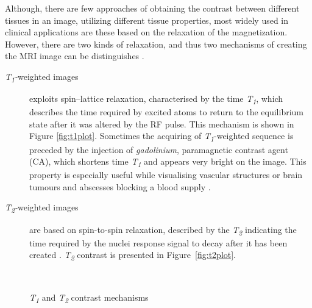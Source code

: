 Although, there are few approaches of obtaining the contrast between different tissues in an image, utilizing different tissue properties, most widely used in clinical applications are these based on the relaxation of the magnetization. However, there are two kinds of relaxation, and thus two mechanisms of creating the MRI image can be distinguishes \cite{biomedical_hanbook_imaging}.
\begin{description}
		\item [\textit{T\textsubscript{1}-}weighted images] exploits spin–lattice relaxation, characterised by the time \textit{T\textsubscript{1}}, which describes the time required by excited atoms to return to the equilibrium state after it was altered by the RF pulse. This mechanism is shown in Figure \ref{fig:t1plot}. Sometimes the acquiring of \textit{T\textsubscript{1}}-weighted sequence is preceded by the injection of \textit{gadolinium}, paramagnetic contrast agent (CA), which  shortens time \textit{T\textsubscript{1}} and appears very bright on the image. This property is especially useful while visualising vascular structures or brain tumours and abscesses blocking a blood supply \cite{biomedical_hanbook_imaging, grover2015magnetic}.   
		
		\item [\textit{T\textsubscript{2}-}weighted images] are based on spin-to-spin relaxation, described by the \textit{T\textsubscript{2}} indicating the time required by the nuclei response signal to decay after it has been created \cite{biomedical_hanbook_imaging, grover2015magnetic}. \textit{T\textsubscript{2}} contrast is presented in Figure~\ref{fig:t2plot}. 
\end{description}
\begin{figure}[H]
\captionsetup[subfloat]{captionskip=0.5cm}
	\centering
	\hspace{1.5cm}
	\\	
\vspace{0.5cm}
\caption[\textit{T\textsubscript{1}} and \textit{T\textsubscript{2}} contrast mechanisms]{\textit{T\textsubscript{1}} and \textit{T\textsubscript{2}} contrast mechanisms \cite{biomedical_hanbook_imaging}}
\label{fig:t1t2plot}
\end{figure}

